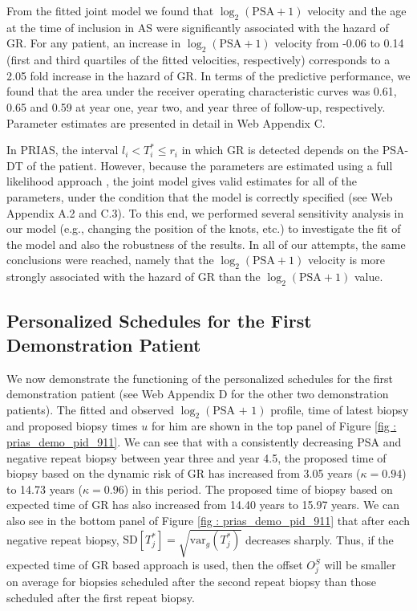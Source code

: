 From the fitted joint model we found that $\log_2 (\mbox{PSA} + 1)$ velocity and the age at the time of inclusion in AS were significantly associated with the hazard of GR. For any patient, an increase in $\log_2 (\mbox{PSA} + 1)$ velocity from -0.06 to 0.14 (first and third quartiles of the fitted velocities, respectively) corresponds to a 2.05 fold increase in the hazard of GR. In terms of the predictive performance, we found that the area under the receiver operating characteristic curves \citep{landmarking2017} was 0.61, 0.65 and 0.59 at year one, year two, and year three of follow-up, respectively. Parameter estimates are presented in detail in Web Appendix C.

In PRIAS, the interval $l_i < T_i^* \leq r_i$ in which GR is detected depends on the PSA-DT of the patient. However, because the parameters are estimated using a full likelihood approach \citep{tsiatis2004joint}, the joint model gives valid estimates for all of the parameters, under the condition that the model is correctly specified (see Web Appendix A.2 and C.3). To this end, we performed several sensitivity analysis in our model (e.g., changing the position of the knots, etc.) to investigate the fit of the model and also the robustness of the results. In all of our attempts, the same conclusions were reached, namely that the $\log_2 (\mbox{PSA} + 1)$ velocity is more strongly associated with the hazard of GR than the $\log_2 (\mbox{PSA} + 1)$ value.

\subsection{Personalized Schedules for the First Demonstration Patient}
\label{subsec : demo_prias_pers_schedule}
We now demonstrate the functioning of the personalized schedules for the first demonstration patient (see Web Appendix D for the other two demonstration patients). The fitted and observed $\log_2 (\mbox{PSA + 1})$ profile, time of latest biopsy and proposed biopsy times $u$ for him are shown in the top panel of Figure \ref{fig : prias_demo_pid_911}. We can see that with a consistently decreasing PSA and negative repeat biopsy between year three and year 4.5, the proposed time of biopsy based on the dynamic risk of GR has increased from 3.05 years ($\kappa=0.94$) to 14.73 years ($\kappa=0.96$) in this period. The proposed time of biopsy based on expected time of GR has also increased from 14.40 years to 15.97 years. We can also see in the bottom panel of Figure \ref{fig : prias_demo_pid_911} that after each negative repeat biopsy, $\mbox{SD}[T^*_j] = \sqrt{\mbox{var}_g(T^*_j)}$ decreases sharply. Thus, if the expected time of GR based approach is used, then the offset $O^S_j$ will be smaller on average for biopsies scheduled after the second repeat biopsy than those scheduled after the first repeat biopsy.

